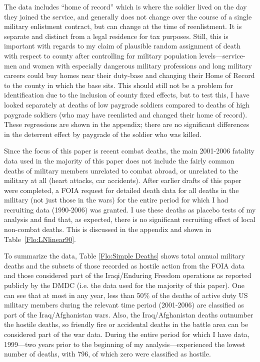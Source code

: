 \documentclass[12pt] {article}
\begin{document}
The data includes {}``home of record'' which is where the soldier lived on the day they joined the service, and generally does not change over the course of a single military enlistment contract, but can change at the time of reenlistment. It is separate and distinct from a legal residence for tax purposes. Still, this is important with regards to my claim of plausible random assignment of death with respect to county after controlling for military population levels---service-men and women with especially dangerous military professions and long military careers could buy homes near their duty-base and changing their Home of Record to the county in which the base sits. This should still not be a problem for identification due to the inclusion of county fixed effects, but to test this, I have looked separately at deaths of low paygrade soldiers compared to deaths of high paygrade soldiers (who may have reenlisted and changed their home of record). These regressions are shown in the appendix; there are no significant differences in the deterrent effect by paygrade of the soldier who was killed. 

Since the focus of this paper is recent combat deaths, the main 2001-2006 fatality data used in the majority of this paper does not include the fairly common deaths of military members unrelated to combat abroad, or unrelated to the military at all (heart attacks, car accidents).  After earlier drafts of this paper were completed, a FOIA request for detailed death data for all deaths in the military (not just those in the wars) for the entire period for which I had recruiting data (1990-2006) was granted. I use these deaths as placebo tests of my analysis and find that, as expected, there is no significant recruiting effect of local non-combat deaths. This is discussed in the appendix and shown in Table~\ref{Flo:LNlinear90}.

To summarize the data, Table \ref{Flo:Simple Deaths} shows total annual military deaths and the subsets of those recorded as hostile action from the FOIA data and those considered part of the Iraqi/Enduring Freedom operations as reported publicly by the DMDC (i.e. the data used for the majority of this paper). One can see that at most in any year, less than 50\% of the deaths of active duty US military members during the relevant time period (2001-2006) are classified as part of the Iraq/Afghanistan wars. Also, the Iraq/Afghanistan deaths outnumber the hostile deaths, so friendly fire or accidental deaths in the battle area can be considered part of the war data. During the entire period for which I have data, 1999---two years prior to the beginning of my analysis---experienced the lowest number of deaths, with 796, of which zero were classified as hostile. 
\end{document}

